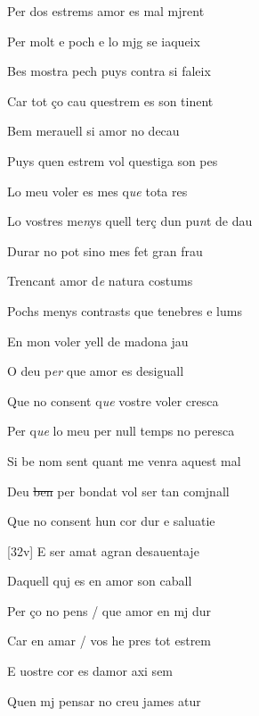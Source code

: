 \documentclass[12pt]{article}
\begin{document}
\begin{estrofa}

 Per dos estrems amor es mal mjrent

 Per molt e poch e lo mjg se iaqueix

 Bes mostra pech puys contra si faleix

 Car tot \c{c}o cau questrem es son tinent

 Bem merauell si amor no decau

 Puys quen estrem vol questiga son pes

 Lo meu voler es mes q\textit{ue} tota res

 Lo vostres me\textit{n}ys quell ter\c{c} dun pu\textit{n}t de dau

\end{estrofa}



\begin{estrofa}

 Durar no pot sino mes fet gran frau

 Trencant amor d\textit{e }natura costums

 Pochs menys contrasts que tenebres e lums

 En mon voler yell de madona jau

 O deu p\textit{er} que amor es desiguall

 Que no consent q\textit{ue} vostre voler cresca

 Per q\textit{ue} lo meu per null temps no peresca

 Si be nom sent quant me venra aquest mal

\end{estrofa}



\begin{estrofa}

 Deu \sout{ben} per bondat vol ser tan comjnall

 Que no consent hun cor dur e saluatie

 [32v] E ser amat agran desauentaje

 Daquell quj es en amor son caball

 Per \c{c}o no pens / que amor en mj dur

 Car en amar / vos he pres tot estrem

 E uostre cor es damor axi sem

 Quen mj pensar no creu james atur

\end{estrofa}
\end{document}
